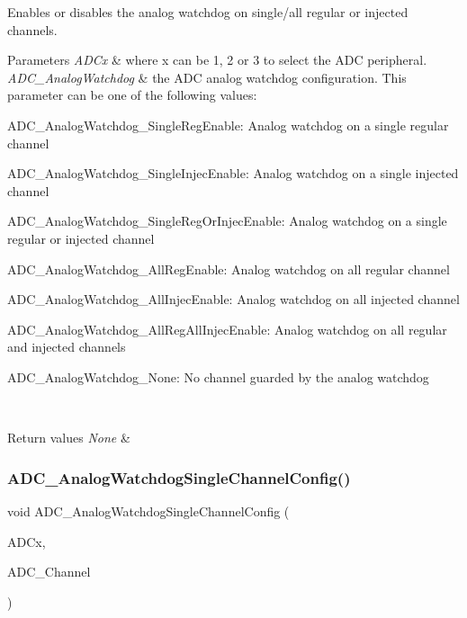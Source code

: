 Enables or disables the analog watchdog on single/all regular or injected channels. 


\begin{DoxyParams}{Parameters}
{\em A\+D\+Cx} & where x can be 1, 2 or 3 to select the A\+DC peripheral. \\
\hline
{\em A\+D\+C\+\_\+\+Analog\+Watchdog} & the A\+DC analog watchdog configuration. This parameter can be one of the following values\+: \begin{DoxyItemize}
\item A\+D\+C\+\_\+\+Analog\+Watchdog\+\_\+\+Single\+Reg\+Enable\+: Analog watchdog on a single regular channel \item A\+D\+C\+\_\+\+Analog\+Watchdog\+\_\+\+Single\+Injec\+Enable\+: Analog watchdog on a single injected channel \item A\+D\+C\+\_\+\+Analog\+Watchdog\+\_\+\+Single\+Reg\+Or\+Injec\+Enable\+: Analog watchdog on a single regular or injected channel \item A\+D\+C\+\_\+\+Analog\+Watchdog\+\_\+\+All\+Reg\+Enable\+: Analog watchdog on all regular channel \item A\+D\+C\+\_\+\+Analog\+Watchdog\+\_\+\+All\+Injec\+Enable\+: Analog watchdog on all injected channel \item A\+D\+C\+\_\+\+Analog\+Watchdog\+\_\+\+All\+Reg\+All\+Injec\+Enable\+: Analog watchdog on all regular and injected channels \item A\+D\+C\+\_\+\+Analog\+Watchdog\+\_\+\+None\+: No channel guarded by the analog watchdog \end{DoxyItemize}
\\
\hline
\end{DoxyParams}

\begin{DoxyRetVals}{Return values}
{\em None} & \\
\hline
\end{DoxyRetVals}
\mbox{\label{group___a_d_c___private___functions_ga03cef3d12292ffa2b8520524d5b0226c}} 
\subsubsection{\texorpdfstring{ADC\_AnalogWatchdogSingleChannelConfig()}{ADC\_AnalogWatchdogSingleChannelConfig()}}
{\footnotesize\ttfamily void A\+D\+C\+\_\+\+Analog\+Watchdog\+Single\+Channel\+Config (\begin{DoxyParamCaption}\item[{\mbox{\hyperlink{struct_a_d_c___type_def}{A\+D\+C\+\_\+\+Type\+Def}} $\ast$}]{A\+D\+Cx,  }\item[{uint8\+\_\+t}]{A\+D\+C\+\_\+\+Channel }\end{DoxyParamCaption})}




